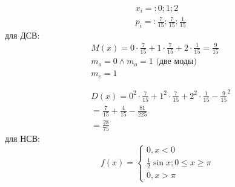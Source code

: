     \begin{ex}
        \begin{equation}
            \begin{align*}
                &x_{i} = : 0; 1; 2\\
                &p_{i} = : \frac{7}{15}; \frac{7}{15}; \frac{1}{15}
            \end{align*}
        \end{equation}
        для ДСВ:
        \begin{equation}
            \begin{align*}
                &M(x) = 0\cdot \frac{7}{15} + 1\cdot \frac{7}{15} + 2\cdot \frac{1}{15} = \frac{9}{15}\\
                &m_{o} = 0 \wedge m_{o} = 1 \text{ (две моды)}\\
                &m_{e} = 1\\
                & \\
                & \\
                &D(x) = 0^{2}\cdot \frac{7}{15} + 1^{2}\cdot \frac{7}{15} + 2^{2}\cdot \frac{1}{15} - {\frac{9}{15}}^{2} \\
                & = \frac{7}{15} + \frac{4}{15} - \frac{81}{225}\\
                & = \frac{28}{75}
            \end{align*}
        \end{equation}
        для НСВ:
        \begin{equation}
            f(x) = 
            \begin{cases}
                0, x < 0 \\
                \frac{1}{2}\sin x; 0 \leq x \geq \pi \\
                0, x > \pi
            \end{cases}


\end{equation}
\end{ex}
